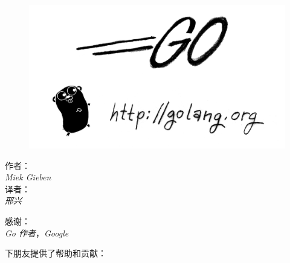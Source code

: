 \documentclass[a4paper,twoside,openleft]{blocksbook}
\begin{document}
\begin{cjkc}
\thispagestyle{empty}
\newcommand{\version}{1.0}
\begin{center}
\\
\vspace{0.5cm}
{}
\end{center}
\vspace*{0.5cm}
\begin{figure}[h!]
\begin{center}
    \includegraphics[scale=0.65]{fig/bumper-inverse.png}
\end{center}
\end{figure}
\vspace*{0.02\stockheight}
\begin{minipage}{0.4\textwidth}
\begin{flushleft} \large
\hspace*{2,0cm}作者：\\
\hspace*{2.0cm}\emph{Miek Gieben}\\
\hspace*{2.0cm}译者：\\
\hspace*{2.0cm}\emph{邢兴}\\
\vfill
\end{flushleft}
\end{minipage}
\hspace{5mm}
\begin{minipage}{0.4\textwidth}
\begin{flushright} \large
感谢：\\
\emph{Go 作者}，\emph{Google}\\
\vfill
\end{flushright}
\end{minipage}
\vspace*{0.5cm}
\begin{center}
下朋友提供了帮助和贡献：


\end{center}
\end{cjkc}
\end{document}
